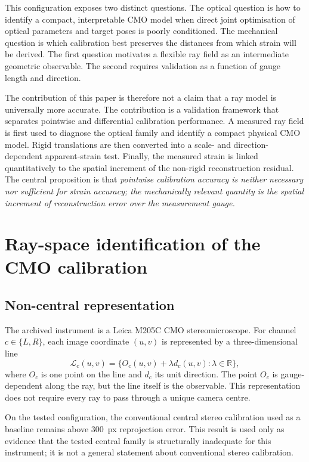 \documentclass[11pt]{article}
\begin{document}
This configuration exposes two distinct questions. The optical question is how to identify a compact, interpretable CMO model when direct joint optimisation of optical parameters and target poses is poorly conditioned. The mechanical question is which calibration best preserves the distances from which strain will be derived. The first question motivates a flexible ray field as an intermediate geometric observable. The second requires validation as a function of gauge length and direction.

The contribution of this paper is therefore not a claim that a ray model is universally more accurate. The contribution is a validation framework that separates pointwise and differential calibration performance. A measured ray field is first used to diagnose the optical family and identify a compact physical CMO model. Rigid translations are then converted into a scale- and direction-dependent apparent-strain test. Finally, the measured strain is linked quantitatively to the spatial increment of the non-rigid reconstruction residual. The central proposition is that \emph{pointwise calibration accuracy is neither necessary nor sufficient for strain accuracy; the mechanically relevant quantity is the spatial increment of reconstruction error over the measurement gauge.}

\section{Ray-space identification of the CMO calibration}
\label{sec:cmo}
\subsection{Non-central representation}
The archived instrument is a Leica M205C CMO stereomicroscope. For channel $c\in\{L,R\}$, each image coordinate $(u,v)$ is represented by a three-dimensional line
\begin{equation}
\mathcal L_c(u,v)=\{O_c(u,v)+\lambda d_c(u,v):\lambda\in\mathbb R\},
\label{eq:rayline}
\end{equation}
where $O_c$ is one point on the line and $d_c$ its unit direction. The point $O_c$ is gauge-dependent along the ray, but the line itself is the observable. This representation does not require every ray to pass through a unique camera centre.

On the tested configuration, the conventional central stereo calibration used as a baseline remains above \SI{300}{px} reprojection error. This result is used only as evidence that the tested central family is structurally inadequate for this instrument; it is not a general statement about conventional stereo calibration.
\end{document}
